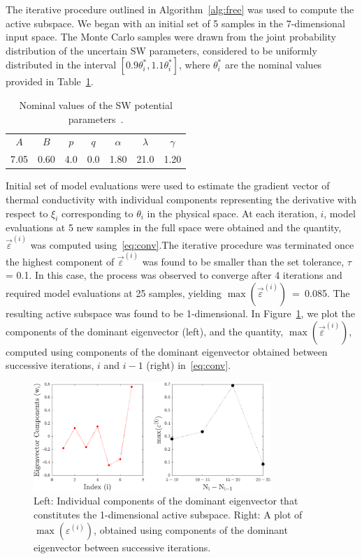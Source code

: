The iterative procedure outlined in Algorithm~\ref{alg:free} was used to compute the active subspace. 
We began
with an initial set of 5 samples in the 7-dimensional input space. The Monte Carlo samples were drawn
from the joint probability distribution of the uncertain SW parameters, considered
to be uniformly distributed in the interval $[0.9\theta_i^\ast,1.1\theta_i^\ast]$, where $\theta_i^\ast$ are the
nominal values provided in Table~\ref{tab:sw}. 
%
\begin{table}[htbp]
\centering
{}
\begin{tabular}{@{}ccccccc@{}}\toprule
$A$ & $B$ & $p$ & $q$ & $\alpha$ & $\lambda$ & $\gamma$ \\
7.05 & 0.60 & 4.0 & 0.0 & 1.80 & 21.0 & 1.20 \\
\bottomrule
\end{tabular}
\caption{Nominal values of the SW potential parameters~\cite{Stillinger:1985}.}
\label{tab:sw}
\end{table}
%
Initial set of model evaluations were used to estimate the gradient vector of thermal conductivity with
individual components representing the derivative with respect to $\xi_i$ corresponding to $\theta_i$ in
the physical space. At each iteration, $i$, model evaluations at 5 new samples in the full space were 
obtained and the quantity, $\vec{\varepsilon}^{(i)}$ was computed using~\eqref{eq:conv}.The iterative
procedure was terminated once the highest component of $\vec{\varepsilon}^{(i)}$ was found to be smaller than
the set tolerance, $\tau$ = 0.1. In this case, the process was observed to converge after 4 iterations
and required model evaluations at 25 samples, yielding $\max(\vec{\varepsilon}^{(i)})$~=~0.085.
 The resulting active subspace was found to be
1-dimensional. In Figure~\ref{fig:casfig1}, we plot the components of the dominant eigenvector (left),
and the quantity, $\max(\vec{\varepsilon}^{(i)})$, computed using components of the dominant eigenvector 
obtained between successive iterations, $i$ and $i-1$ (right) in~\eqref{eq:conv}.
%
\begin{figure}[htbp]
\begin{center}
\includegraphics[width=0.8\textwidth]{./Figures/free_eigv5}
\caption{Left: Individual components of the dominant eigenvector that constitutes the 1-dimensional
active subspace. Right: A plot of $\max(\varepsilon^{(i)})$, obtained
using components of the dominant eigenvector between successive iterations.}
\label{fig:casfig1}
\end{center}
\end{figure}
%

